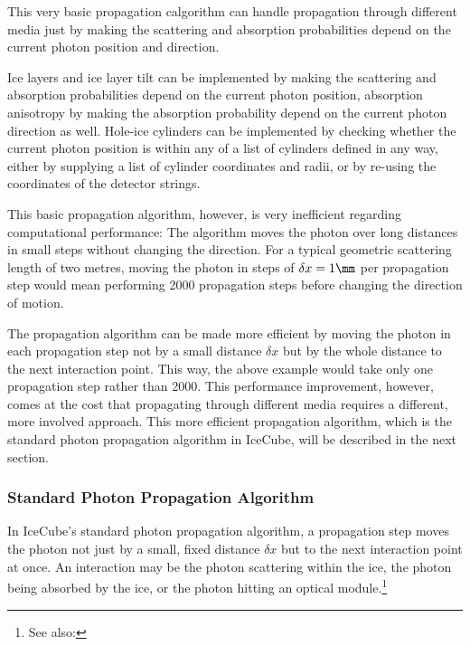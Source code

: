 \FloatBarrier

This very basic propagation calgorithm can handle propagation through different media just by making the scattering and absorption probabilities depend on the current photon position and direction.

Ice layers and ice layer tilt can be implemented by making the scattering and absorption probabilities depend on the current photon position, absorption anisotropy by making the absorption probability depend on the current photon direction as well. Hole-ice cylinders can be implemented by checking whether the current photon position is within any of a list of cylinders defined in any way, either by supplying a list of cylinder coordinates and radii, or by re-using the coordinates of the detector strings.

This basic propagation algorithm, however, is very inefficient regarding computational performance: The algorithm moves the photon over long distances in small steps without changing the direction. For a typical geometric scattering length of two metres, moving the photon in steps of $\delta x = 1\mm$ per propagation step would mean performing 2000 propagation steps before changing the direction of motion.

The propagation algorithm can be made more efficient by moving the photon in each propagation step not by a small distance $\delta x$ but by the whole distance to the next interaction point. This way, the above example would take only one propagation step rather than 2000. This performance improvement, however, comes at the cost that propagating through different media requires a different, more involved approach. This more efficient propagation algorithm, which is the standard photon propagation algorithm in IceCube, will be described in the next section.

\subsubsection{Standard Photon Propagation Algorithm}
\label{sec:standardphotonpropagationalgorithm}

In IceCube's standard photon propagation algorithm, a propagation step moves the photon not just by a small, fixed distance $\delta x$ but to the next interaction point at once. An interaction may be the photon scattering within the ice, the photon being absorbed by the ice, or the photon hitting an optical module.\footnote{See also: }

